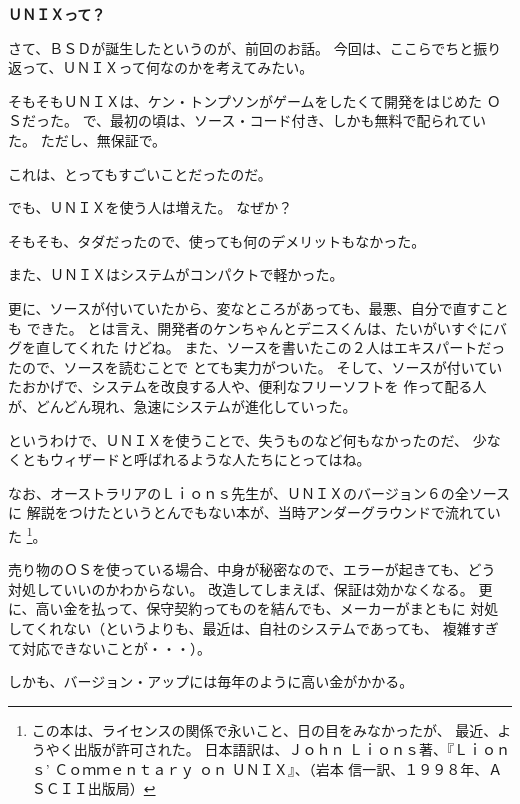 \documentclass[12pt]{jarticle}
\begin{document}
\textbf{\large ＵＮＩＸって？}

\bigskip
\bigskip

さて、ＢＳＤが誕生したというのが、前回のお話。
今回は、ここらでちと振り返って、ＵＮＩＸって何なのかを考えてみたい。

\bigskip

そもそもＵＮＩＸは、ケン・トンプソンがゲームをしたくて開発をはじめた
ＯＳだった。
で、最初の頃は、ソース・コード付き、しかも無料で配られていた。
ただし、無保証で。

これは、とってもすごいことだったのだ。

\bigskip

でも、ＵＮＩＸを使う人は増えた。
なぜか？

\bigskip

そもそも、タダだったので、使っても何のデメリットもなかった。

また、ＵＮＩＸはシステムがコンパクトで軽かった。

更に、ソースが付いていたから、変なところがあっても、最悪、自分で直すことも
できた。
とは言え、開発者のケンちゃんとデニスくんは、たいがいすぐにバグを直してくれた
けどね。
また、ソースを書いたこの２人はエキスパートだったので、ソースを読むことで
とても実力がついた。
そして、ソースが付いていたおかげで、システムを改良する人や、便利なフリーソフトを
作って配る人が、どんどん現れ、急速にシステムが進化していった。

というわけで、ＵＮＩＸを使うことで、失うものなど何もなかったのだ、
少なくともウィザードと呼ばれるような人たちにとってはね。

\bigskip

なお、オーストラリアのＬｉｏｎｓ先生が、ＵＮＩＸのバージョン６の全ソースに
解説をつけたというとんでもない本が、当時アンダーグラウンドで流れていた
\footnote{この本は、ライセンスの関係で永いこと、日の目をみなかったが、
最近、ようやく出版が許可された。
日本語訳は、Ｊｏｈｎ Ｌｉｏｎｓ著、『Ｌｉｏｎｓ’ Ｃｏｍｍｅｎｔａｒｙ ｏｎ
 ＵＮＩＸ』、（岩本 信一訳、１９９８年、ＡＳＣＩＩ出版局）}。

\bigskip

売り物のＯＳを使っている場合、中身が秘密なので、エラーが起きても、どう
対処していいのかわからない。
改造してしまえば、保証は効かなくなる。
更に、高い金を払って、保守契約ってものを結んでも、メーカーがまともに
対処してくれない（というよりも、最近は、自社のシステムであっても、
複雑すぎて対応できないことが・・・）。

しかも、バージョン・アップには毎年のように高い金がかかる。

\bigskip
\end{document}
